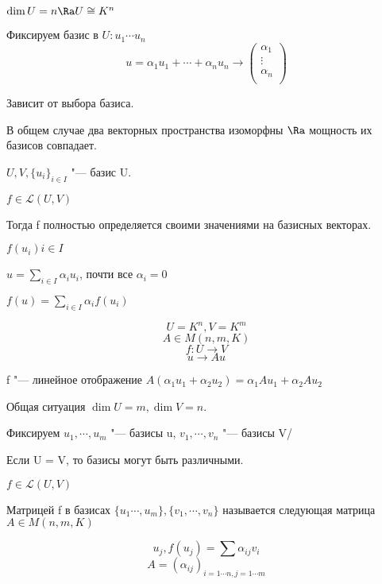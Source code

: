 \begin{conseq}
$\dim U = n \Ra U \cong K^n$

Фиксируем базис в $U\colon u_1 \cdots u_n$
$$ u = \alpha_1 u_1 + \cdots + \alpha_n u_n \to 
\begin{pmatrix}
\alpha_1\\
\vdots\\
\alpha_n\\
\end{pmatrix}$$

Зависит от выбора базиса.
\end{conseq}

\begin{Rem}
В общем случае два векторных пространства изоморфны 
$\Ra$ мощность их базисов совпадает. 
\end{Rem}

\begin{Rem}
$U, V, \{u_{i}\}_{i \in I}$ "--- базис U.

$f \in \mathcal{L}(U, V)$

Тогда f полностью определяется своими значениями на базисных векторах.

$f(u_i) i \in I$

$u = \sum_{i \in I}\alpha_i u_i$, почти все $\alpha_i = 0$

$f(u) = \sum_{i \in I}\alpha_if(u_i)$
\end{Rem}

\begin{exmp}
$$U = K^n, V = K^m$$
$$A \in M(n, m, K)$$
$$f \colon U \to V$$
$$ u \to Au$$

f "--- линейное отображение $A(\alpha_1 u_1 + \alpha_2 u_2) = \alpha_1Au_1 + \alpha_2 A u_2$

Общая ситуация $\dim U = m, \dim V = n$.

Фиксируем $u_1, \cdots, u_m$ "--- базисы u, $v_1, \cdots, v_n$ "--- базисы V/

\begin{Rem}
Если U = V, то базисы могут быть различными.
\end{Rem}

$f \in \mathcal{L}(U,V)$
\end{exmp}

\begin{Def}
Матрицей f в базисах $\{u_1 \cdots, u_m\}, \{v_1, \cdots, v_n\}$
называется следующая матрица $A \in M(n, m, K)$

$$u_j, f(u_j) = \sum\alpha_{ij}v_i$$
$$A = (\alpha_{ij})_{i = 1 \cdots n, j = 1 \cdots m}$$
\end{Def}


